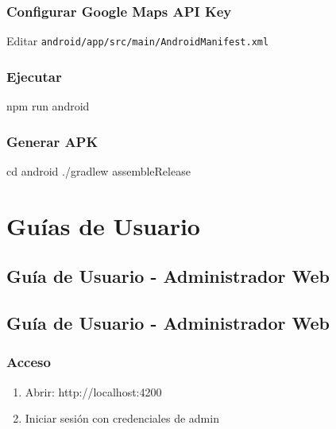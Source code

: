 \documentclass[
  spanish,
  11pt,
  letterpaper,
]{book}
\newenvironment{Shaded}{\begin{snugshade}}{\end{snugshade}}
\newcommand{\BuiltInTok}[1]{\textcolor[rgb]{0.00,0.23,0.31}{#1}}
\newcommand{\ExtensionTok}[1]{\textcolor[rgb]{0.00,0.23,0.31}{#1}}
\newcommand{\NormalTok}[1]{\textcolor[rgb]{0.00,0.23,0.31}{#1}}
\providecommand{\tightlist}{%
  \setlength{\itemsep}{0pt}\setlength{\parskip}{0pt}}
\begin{document}
\section{Configurar Google Maps API
Key}\label{configurar-google-maps-api-key}

Editar \texttt{android/app/src/main/AndroidManifest.xml}

\section{Ejecutar}\label{ejecutar-1}

\begin{Shaded}
\begin{Highlighting}[]
\ExtensionTok{npm}\NormalTok{ run android}
\end{Highlighting}
\end{Shaded}

\section{Generar APK}\label{generar-apk}

\begin{Shaded}
\begin{Highlighting}[]
\BuiltInTok{cd}\NormalTok{ android}
\ExtensionTok{./gradlew}\NormalTok{ assembleRelease}
\end{Highlighting}
\end{Shaded}

\part{Guías de Usuario}

\chapter{Guía de Usuario - Administrador
Web}\label{guuxeda-de-usuario---administrador-web}

\chapter{Guía de Usuario - Administrador
Web}\label{guuxeda-de-usuario---administrador-web-1}

\section{Acceso}\label{acceso}

\begin{enumerate}
\def\labelenumi{\arabic{enumi}.}
\tightlist
\item
  Abrir: http://localhost:4200
\item
  Iniciar sesión con credenciales de admin
\end{enumerate}
\end{document}
